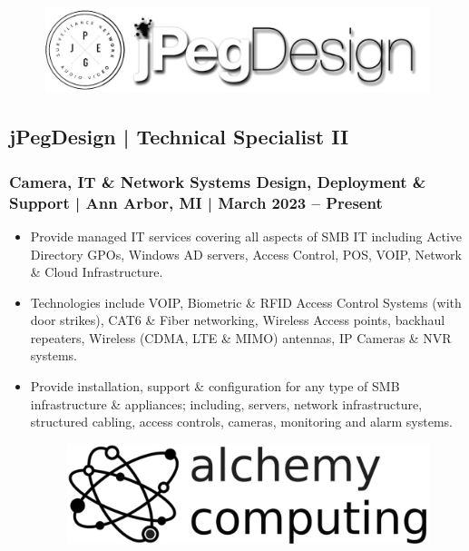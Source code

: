 \documentclass[letter,10pt]{article}
\begin{document}
\begin{figure}
\includegraphics[width=0.8\linewidth]{./img/jpeg_banner.jpg}
\end{figure}

\subsection*{jPegDesign | Technical Specialist II}
\label{sec:org1abddf6}
\subsubsection*{Camera, IT \& Network Systems Design, Deployment \& Support | Ann Arbor, MI | March 2023 – Present}
\label{sec:org7c61e07}
\begin{itemize}
\item Provide managed IT services covering all aspects of SMB IT including Active Directory GPOs, Windows AD servers, Access Control, POS, VOIP, Network \& Cloud Infrastructure.
\label{sec:org16c6039}
\item Technologies include VOIP, Biometric \& RFID Access Control Systems (with door strikes), CAT6 \& Fiber networking, Wireless Access points, backhaul repeaters, Wireless (CDMA, LTE \& MIMO) antennas, IP Cameras \& NVR systems.
\label{sec:orgd1c0062}
\item Provide installation, support \& configuration for any type of SMB infrastructure \& appliances; including, servers, network infrastructure, structured cabling, access controls, cameras, monitoring and alarm systems.
\label{sec:org41342d3}




\begin{figure}
\includegraphics[width=0.8\linewidth]{./img/50p_alchemy_computing.jpg}
\end{figure}
\end{itemize}
\end{document}
